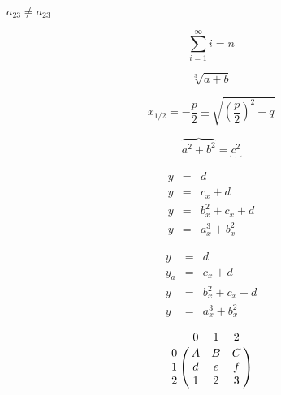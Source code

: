 \documentclass[12pt,ngerman]{scrartcl}
\begin{document}
$a_23 \not= a_{23}$

\[\sum_{i=1}^{\infty} i = n \]

\[ \sqrt[3]{a+b} \]

\[x_{1/2} = -\frac{p}{2} \pm  
\sqrt{ 
   \left( 
        \frac{p}{2}
   \right)^2 - q } \]
   
   
\[ \overbrace{a^2 + b^2} 
= \underbrace{c^2 }\]


\begin{eqnarray}
 y & = & d\\
 y & = & c_x+d\\
 y & = & b_x^{2}+c_x+d\\
 y & = & a_x^{3}+b_x^{2}
\end{eqnarray}


\[
\begin{array}{lcr}
 y & = & d\\
 y_{a}& = & c_x+d\\
 y & = & b_x^{2}+c_x+d\\
 y & = & a_x^{3}+b_x^{2}
\end{array}\]


\[
\bordermatrix{%
 & 0 & 1 & 2 \cr
 0 & A & B & C \cr
 1 & d & e & f \cr
 2 & 1 & 2 & 3 \cr
}
\]
\end{document}
